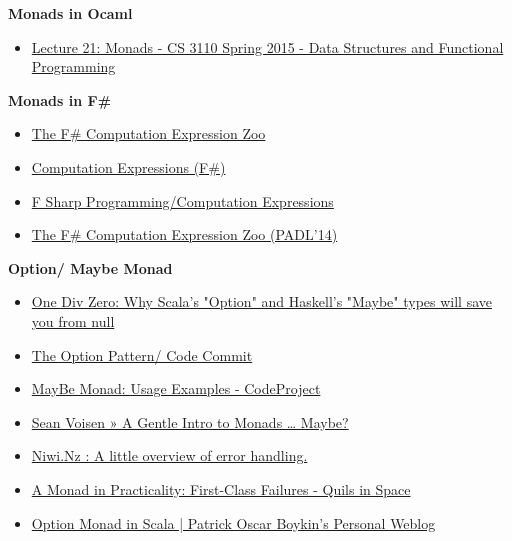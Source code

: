 \documentclass[11pt]{article}
\begin{document}
\textbf{Monads in Ocaml}

\begin{itemize}
\item \href{https://www.cs.cornell.edu/Courses/cs3110/2015sp/lectures/21/lec21.html}{Lecture 21: Monads - CS 3110 Spring 2015 - Data Structures and Functional Programming}
\end{itemize}

\textbf{Monads in F\#}

\begin{itemize}
\item \href{http://research.microsoft.com/pubs/217375/computation-zoo.pdf}{The F\# Computation Expression Zoo}

\item \href{https://msdn.microsoft.com/en-us/library/dd233182.aspx}{Computation Expressions (F\#)}

\item \href{https://en.wikibooks.org/wiki/F_Sharp_Programming/Computation_Expressions}{F Sharp Programming/Computation Expressions}

\item \href{http://tomasp.net/blog/2013/computation-zoo-padl/}{The F\# Computation Expression Zoo (PADL'14)}
\end{itemize}

\textbf{Option/ Maybe Monad}

\begin{itemize}
\item \href{http://james-iry.blogspot.com.br/2010/08/why-scalas-and-haskells-types-will-save.html}{One Div Zero: Why Scala's "Option" and Haskell's "Maybe" types will save you from null}

\item \href{http://www.codecommit.com/blog/scala/the-option-pattern}{The Option Pattern/ Code Commit}

\item \href{http://www.codeproject.com/Articles/845601/MayBe-Monad-Usage-Examples}{MayBe Monad: Usage Examples - CodeProject}

\item \href{http://sean.voisen.org/blog/2013/10/intro-monads-maybe/}{Sean Voisen » A Gentle Intro to Monads … Maybe?}

\item \href{https://www.niwi.nz/2015/03/08/error-handling/}{Niwi.Nz : A little overview of error handling.}

\item \href{http://robotlolita.me/2013/12/08/a-monad-in-practicality-first-class-failures.html}{A Monad in Practicality: First-Class Failures - Quils in Space}

\item \href{https://boykin.wordpress.com/2011/09/11/option-monad-in-scala/}{Option Monad in Scala | Patrick Oscar Boykin's Personal Weblog}
\end{itemize}
\end{document}
